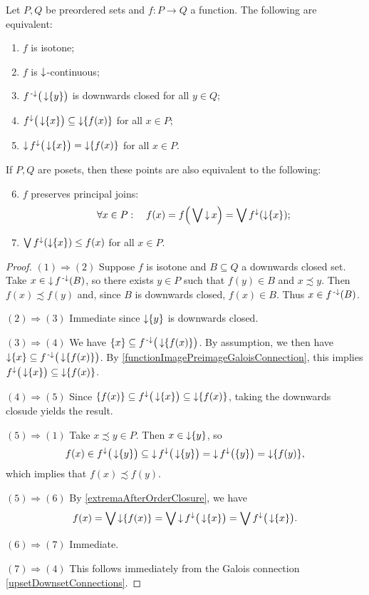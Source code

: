 \begin{proposition} \label{isotoneIffDownsetContinuous}
Let $P,Q$ be preordered sets and $f: P\to Q$ a function. The following are equivalent:
\begin{enumerate}
\item $f$ is isotone;
\item $f$ is $\operatorname{\downarrow}$-continuous;
\item $f^{{\text{\hspace{0.15em}-}\downarrow}}\big(\operatorname{\downarrow}\{y\}\big)$ is downwards closed for all $y\in Q$;
\item $f^\downarrow\big(\operatorname{\downarrow}\{x\}\big) \subseteq \operatorname{\downarrow}\{f(x)\}$ for all $x\in P$;
\item $\operatorname{\downarrow} f^\downarrow\big(\operatorname{\downarrow}\{x\}\big) = \operatorname{\downarrow}\{f(x)\}$ for all $x\in P$.
\end{enumerate}
If $P,Q$ are posets, then these points are also equivalent to the following:
\begin{enumerate} \setcounter{enumi}{5}
\item $f$ preserves principal joins:
\[ \forall x\in P: \quad f(x) = f\Big(\bigvee \operatorname{\downarrow} x\Big) = \bigvee f^\downarrow(\operatorname{\downarrow} \{x\}); \]
\item $\bigvee f^\downarrow(\operatorname{\downarrow} \{x\}) \leq f(x)$ for all $x\in P$.
\end{enumerate}
\end{proposition}
\begin{proof}
$(1) \Rightarrow (2)$ Suppose $f$ is isotone and $B\subseteq Q$ a downwards closed set. Take $x\in \operatorname{\downarrow} f^{\text{\hspace{0.15em}-}\downarrow}(B)$, so there exists $y\in P$ such that $f(y) \in B$ and $x\precsim y$. Then $f(x) \precsim f(y)$ and, since $B$ is downwards closed, $f(x) \in B$. Thus $x\in f^{\text{\hspace{0.15em}-}\downarrow}(B)$.

$(2) \Rightarrow (3)$ Immediate since $\operatorname{\downarrow}\{y\}$ is downwards closed.

$(3) \Rightarrow (4)$ We have $\{x\} \subseteq f^{\text{\hspace{0.15em}-}\downarrow}\big(\operatorname{\downarrow}\{f(x)\}\big)$. By assumption, we then have $\operatorname{\downarrow} \{x\} \subseteq f^{\text{\hspace{0.15em}-}\downarrow}\big(\operatorname{\downarrow}\{f(x)\}\big)$. By \ref{functionImagePreimageGaloisConnection}, this implies $f^\downarrow\big(\operatorname{\downarrow} \{x\}\big) \subseteq \operatorname{\downarrow}\{f(x)\}$.

$(4) \Rightarrow (5)$ Since $\{f(x)\} \subseteq f^\downarrow\big(\operatorname{\downarrow} \{x\}\big) \subseteq \operatorname{\downarrow}\{f(x)\}$, taking the downwards closude yields the result.

$(5) \Rightarrow (1)$ Take $x\precsim y \in P$. Then $x\in \operatorname{\downarrow} \{y\}$, so
\[ f(x) \in f^\downarrow\big(\operatorname{\downarrow} \{y\}\big) \subseteq \operatorname{\downarrow} f^\downarrow\big(\operatorname{\downarrow} \{y\}\big) = \operatorname{\downarrow} f^\downarrow\big(\{y\}\big) = \operatorname{\downarrow} \{f(y)\}, \]
which implies that $f(x) \precsim f(y)$.

$(5) \Rightarrow (6)$ By \ref{extremaAfterOrderClosure}, we have
\[ f(x) = \bigvee \operatorname{\downarrow} \{f(x)\} = \bigvee \operatorname{\downarrow} f^\downarrow\big(\operatorname{\downarrow}\{x\}\big) = \bigvee f^\downarrow\big(\operatorname{\downarrow}\{x\}\big). \]

$(6) \Rightarrow (7)$ Immediate.

$(7) \Rightarrow (4)$ This follows immediately from the Galois connection \ref{upsetDownsetConnections}.
\end{proof}

